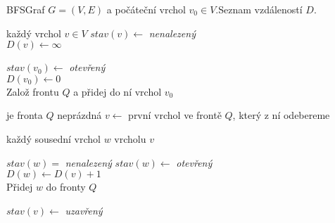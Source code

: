 \begin{pseudo}{BFS}{Graf $G=(V,E)$ a počáteční vrchol $v_0\in V$.}{Seznam vzdáleností $D$.}
    \begin{For}{každý vrchol $v\in V$}
        $stav(v)\leftarrow$ \textit{nenalezený}\\
        $D(v)\leftarrow\infty$
    \end{For}
    $stav(v_0)\leftarrow$ \textit{otevřený}\\
    $D(v_0)\leftarrow 0$\\
    Založ frontu $Q$ a přidej do ní vrchol $v_0$\\
    \begin{While}{je fronta $Q$ neprázdná}
        $v\leftarrow$ první vrchol ve frontě $Q$, který z ní odebereme\\
        \begin{For}{každý sousední vrchol $w$ vrcholu $v$}
            \begin{If}{$stav(w)=$ \textit{nenalezený}}
                $stav(w)\leftarrow$ \textit{otevřený}\\
                $D(w)\leftarrow D(v)+1$\\
                Přidej $w$ do fronty $Q$
            \end{If}
        \end{For}
        $stav(v)\leftarrow$ \textit{uzavřený}
    \end{While}
\end{pseudo}